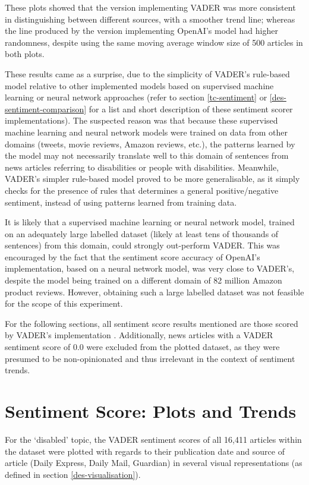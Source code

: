 \documentclass{report}
\begin{document}
These plots showed that the version implementing VADER was more consistent in distinguishing between different sources, with a smoother trend line; 
whereas the line produced by the version implementing OpenAI's model had higher randomness, despite using the same moving average window size of 500 articles in both plots.

These results came as a surprise, due to the simplicity of VADER's rule-based model relative to other implemented models based on supervised machine learning or neural network approaches (refer to section \ref{tc-sentiment} or \ref{des-sentiment-comparison} for a list and short description of these sentiment scorer implementations).
The suspected reason was that because these supervised machine learning and neural network models were trained on data from other domains (tweets, movie reviews, Amazon reviews, etc.), the patterns learned by the model may not necessarily translate well to this domain of sentences from news articles referring to disabilities or people with disabilities. 
Meanwhile, VADER's simpler rule-based model proved to be more generalisable, as it simply checks for the presence of rules that determines a general positive/negative sentiment, instead of using patterns learned from training data.

It is likely that a supervised machine learning or neural network model, trained on an adequately large labelled dataset (likely at least tens of thousands of sentences) from this domain, could strongly out-perform VADER. 
This was encouraged by the fact that the sentiment score accuracy of OpenAI's implementation, based on a neural network model, was very close to VADER's, despite the model being trained on a different domain of 82 million Amazon product reviews. 
However, obtaining such a large labelled dataset was not feasible for the scope of this experiment.

For the following sections, all sentiment score results mentioned are those scored by VADER's implementation \cite{VADER}.
Additionally, news articles with a VADER sentiment score of 0.0 were excluded from the plotted dataset, as they were presumed to be non-opinionated and thus irrelevant in the context of sentiment trends.

\section{Sentiment Score: Plots and Trends} \label{Sentiment score: plots and trends}
For the `disabled' topic, the VADER sentiment scores of all 16,411 articles within the dataset were plotted with regards to their publication date and source of article (Daily Express, Daily Mail, Guardian) in several visual representations (as defined in section \ref{des-visualisation}).
\end{document}
